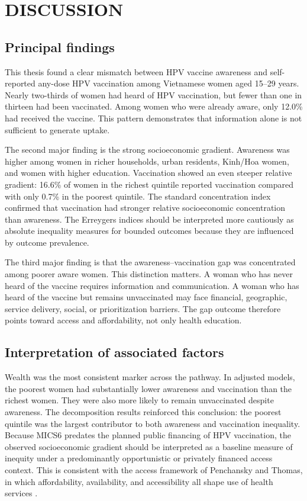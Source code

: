 \chapter{DISCUSSION}

\section{Principal findings}

This thesis found a clear mismatch between HPV vaccine awareness and self-reported any-dose HPV vaccination among Vietnamese women aged 15--29 years. Nearly two-thirds of women had heard of HPV vaccination, but fewer than one in thirteen had been vaccinated. Among women who were already aware, only 12.0\% had received the vaccine. This pattern demonstrates that information alone is not sufficient to generate uptake.

The second major finding is the strong socioeconomic gradient. Awareness was higher among women in richer households, urban residents, Kinh/Hoa women, and women with higher education. Vaccination showed an even steeper relative gradient: 16.6\% of women in the richest quintile reported vaccination compared with only 0.7\% in the poorest quintile. The standard concentration index confirmed that vaccination had stronger relative socioeconomic concentration than awareness. The Erreygers indices should be interpreted more cautiously as absolute inequality measures for bounded outcomes because they are influenced by outcome prevalence.

The third major finding is that the awareness--vaccination gap was concentrated among poorer aware women. This distinction matters. A woman who has never heard of the vaccine requires information and communication. A woman who has heard of the vaccine but remains unvaccinated may face financial, geographic, service delivery, social, or prioritization barriers. The gap outcome therefore points toward access and affordability, not only health education.

\section{Interpretation of associated factors}

Wealth was the most consistent marker across the pathway. In adjusted models, the poorest women had substantially lower awareness and vaccination than the richest women. They were also more likely to remain unvaccinated despite awareness. The decomposition results reinforced this conclusion: the poorest quintile was the largest contributor to both awareness and vaccination inequality. Because MICS6 predates the planned public financing of HPV vaccination, the observed socioeconomic gradient should be interpreted as a baseline measure of inequity under a predominantly opportunistic or privately financed access context. This is consistent with the access framework of Penchansky and Thomas, in which affordability, availability, and accessibility all shape use of health services \cite{penchansky1981}.

